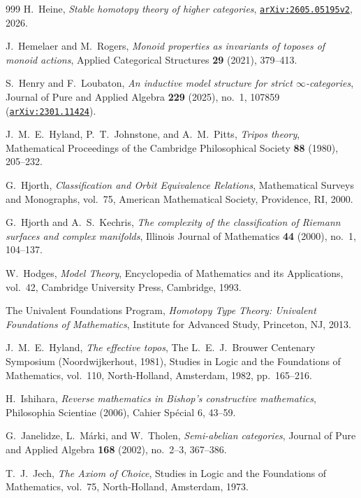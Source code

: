 \begin{thebibliography}{999}
H.~Heine,
\emph{Stable homotopy theory of higher categories},
\href{https://arxiv.org/abs/2605.05195v2}{\texttt{arXiv:2605.05195v2}}, 2026.

J.~Hemelaer and M.~Rogers,
\emph{Monoid properties as invariants of toposes of monoid actions},
Applied Categorical Structures \textbf{29} (2021), 379--413.

S.~Henry and F.~Loubaton,
\emph{An inductive model structure for strict $\infty$-categories},
Journal of Pure and Applied Algebra \textbf{229} (2025), no.~1, 107859 (\href{https://arxiv.org/abs/2301.11424}{\texttt{arXiv:2301.11424}}).

J.~M.~E.~Hyland, P.~T.~Johnstone, and A.~M.~Pitts,
\emph{Tripos theory},
Mathematical Proceedings of the Cambridge Philosophical Society \textbf{88} (1980), 205--232.

G.~Hjorth,
\emph{Classification and Orbit Equivalence Relations},
Mathematical Surveys and Monographs, vol.~75, American Mathematical Society, Providence, RI, 2000.

G.~Hjorth and A.~S.~Kechris,
\emph{The complexity of the classification of Riemann surfaces and complex manifolds},
Illinois Journal of Mathematics \textbf{44} (2000), no.~1, 104--137.

W.~Hodges,
\emph{Model Theory},
Encyclopedia of Mathematics and its Applications, vol.~42, Cambridge University Press, Cambridge, 1993.

The Univalent Foundations Program,
\emph{Homotopy Type Theory: Univalent Foundations of Mathematics},
Institute for Advanced Study, Princeton, NJ, 2013.

J.~M.~E.~Hyland,
\emph{The effective topos},
The L.~E.~J.~Brouwer Centenary Symposium (Noordwijkerhout, 1981), Studies in Logic and the Foundations of Mathematics, vol.~110, North-Holland, Amsterdam, 1982, pp.~165--216.

H.~Ishihara,
\emph{Reverse mathematics in Bishop's constructive mathematics},
Philosophia Scientiae (2006), Cahier Sp\'ecial 6, 43--59.

G.~Janelidze, L.~M\'arki, and W.~Tholen,
\emph{Semi-abelian categories},
Journal of Pure and Applied Algebra \textbf{168} (2002), no.~2--3, 367--386.

T.~J.~Jech,
\emph{The Axiom of Choice},
Studies in Logic and the Foundations of Mathematics, vol.~75, North-Holland, Amsterdam, 1973.


\end{thebibliography}
